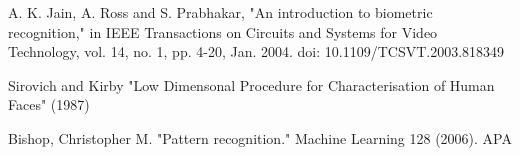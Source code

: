 \documentclass[conference]{IEEEtran}
\begin{document}
%
%
%
\begin{thebibliography}{1}

A. K. Jain, A. Ross and S. Prabhakar, "An introduction to biometric recognition," in IEEE Transactions on Circuits and Systems for Video Technology, vol. 14, no. 1, pp. 4-20, Jan. 2004.
doi: 10.1109/TCSVT.2003.818349

 Sirovich and Kirby "Low Dimensonal Procedure for Characterisation of Human Faces" (1987)
 
 Bishop, Christopher M. "Pattern recognition." Machine Learning 128 (2006).
APA	


\end{thebibliography}

  


\end{document}
